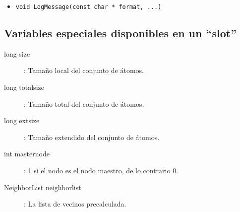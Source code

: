 \documentclass[a4paper,12pt]{article}
\begin{document}
\begin{itemize}
\item \verb'void LogMessage(const char * format, ...)'
\end{itemize}

\subsection{Variables especiales disponibles en un ``slot''}

\begin{description}
\item[long size]{: Tama\~no local del conjunto de \'atomos.}
\item[long totalsize]{: Tama\~no total del conjunto de \'atomos.}
\item[long extsize]{: Tama\~no extendido del conjunto de \'atomos.}
\item[int masternode]{: 1 si el nodo es el nodo maestro, de lo contrario 0.}
\item[NeighborList neighborlist]{: La lista de vecinos precalculada.}
\end{description}
\end{document}
